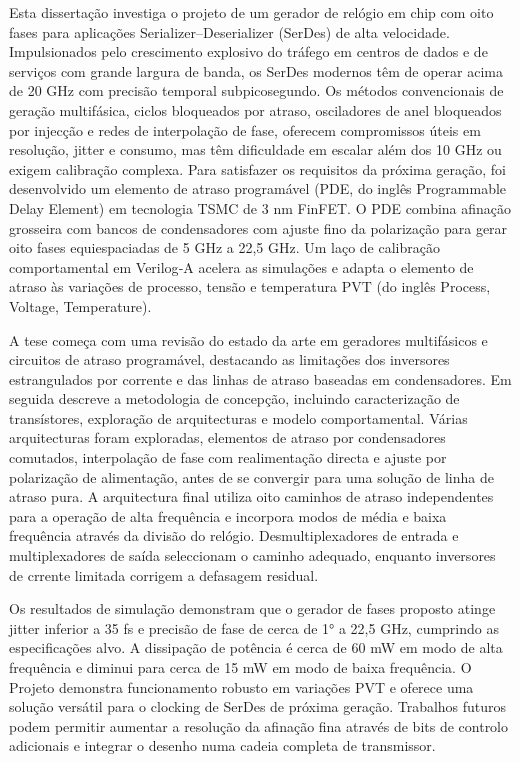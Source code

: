 Esta dissertação investiga o projeto de um gerador de relógio em chip com oito fases para aplicações Serializer–Deserializer (SerDes) de alta velocidade.  Impulsionados pelo crescimento explosivo do tráfego em centros de dados e de serviços com grande largura de banda, os SerDes modernos têm de operar acima de 20 GHz com precisão temporal subpicosegundo.  Os métodos convencionais de geração multifásica, ciclos bloqueados por atraso, osciladores de anel bloqueados por injecção e redes de interpolação de fase, oferecem compromissos úteis em resolução, jitter e consumo, mas têm dificuldade em escalar além dos 10 GHz ou exigem calibração complexa.  Para satisfazer os requisitos da próxima geração, foi desenvolvido um elemento de atraso programável (PDE, do inglês Programmable Delay Element) em tecnologia TSMC de 3 nm FinFET.  O PDE combina afinação grosseira com bancos de condensadores com ajuste fino da polarização para gerar oito fases equiespaciadas de 5 GHz a 22,5 GHz.  Um laço de calibração comportamental em Verilog‑A acelera as simulações e adapta o elemento de atraso às variações de processo, tensão e temperatura PVT (do inglês Process, Voltage, Temperature).

A tese começa com uma revisão do estado da arte em geradores multifásicos e circuitos de atraso programável, destacando as limitações dos inversores estrangulados por corrente e das linhas de atraso baseadas em condensadores.  Em seguida descreve a metodologia de concepção, incluindo caracterização de transístores, exploração de arquitecturas e modelo comportamental.  Várias arquitecturas foram exploradas, elementos de atraso por condensadores comutados, interpolação de fase com realimentação directa e ajuste por polarização de alimentação, antes de se convergir para uma solução de linha de atraso pura.  A arquitectura final utiliza oito caminhos de atraso independentes para a operação de alta frequência e incorpora modos de média e baixa frequência através da divisão do relógio.  Desmultiplexadores de entrada e multiplexadores de saída seleccionam o caminho adequado, enquanto inversores de crrente limitada corrigem a defasagem residual.

Os resultados de simulação demonstram que o gerador de fases proposto atinge jitter inferior a 35 fs e precisão de fase de cerca de 1° a 22,5 GHz, cumprindo as especificações alvo.  A dissipação de potência é cerca de 60 mW em modo de alta frequência e diminui para cerca de 15 mW em modo de baixa frequência.  O Projeto demonstra funcionamento robusto em variações PVT e oferece uma solução versátil para o clocking de SerDes de próxima geração.  Trabalhos futuros podem permitir aumentar a resolução da afinação fina através de bits de controlo adicionais e integrar o desenho numa cadeia completa de transmissor.